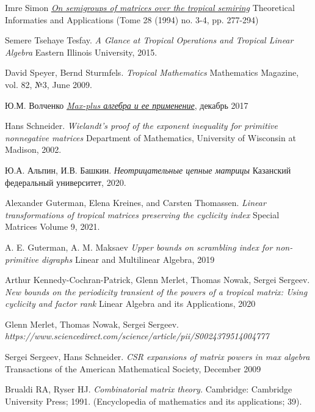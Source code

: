 \documentclass[12pt]{article}
\begin{document}
\begin{thebibliography}{9}
Imre Simon
\textit{\href{http://www.numdam.org/item?id=ITA_1994__28_3-4_277_0}{On semigroups of matrices over the tropical semiring}}
Theoretical Informaties and Applications (Tome 28 (1994) no. 3-4, pp. 277-294)

Semere Tsehaye Tesfay.
\textit{A Glance at Tropical Operations and Tropical Linear Algebra}
Eastern Illinois University, 2015.

David Speyer, Bernd Sturmfels.
\textit{Tropical Mathematics}
Mathematics Magazine, vol. 82, №3, June 2009.

Ю.М. Волченко
\textit{\href{http://yura.volchenko.com/Science/Max-plus.pdf}{Max-plus алгебра и ее применение}}, декабрь 2017

Hans Schneider.
\textit{Wielandt’s proof of the exponent inequality for
primitive nonnegative matrices}
Department of Mathematics, University of Wisconsin at Madison, 2002.

Ю.А. Альпин, И.В. Башкин.
\textit{Неотрицательные цепные матрицы}
Казанский федеральный университет, 2020.

Alexander Guterman, Elena Kreines, and Carsten Thomassen.
\textit{Linear transformations of tropical matrices
preserving the cyclicity index}
Special Matrices Volume 9, 2021.

A. E. Guterman, A. M. Maksaev
\textit{Upper bounds on scrambling index for non-primitive digraphs}
Linear and Multilinear Algebra, 2019

Arthur Kennedy-Cochran-Patrick, Glenn Merlet, Thomas Nowak, Sergei Sergeev.
\textit{New bounds on the periodicity transient of the powers of a tropical matrix: Using cyclicity and factor rank}
Linear Algebra and its Applications, 2020

Glenn Merlet, Thomas Nowak, Sergei Sergeev.
\\\textit{https://www.sciencedirect.com/science/article/pii/S0024379514004777}

Sergei Sergeev, Hans Schneider.
\textit{CSR expansions of matrix powers in max algebra} Transactions of the American Mathematical Society, December 2009

Brualdi RA, Ryser HJ. \textit{Combinatorial matrix theory.} Cambridge: Cambridge University Press;
1991. (Encyclopedia of mathematics and its applications; 39).
\end{thebibliography}
\end{document}
